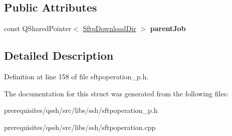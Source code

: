 \subsection*{Public Attributes}
\begin{DoxyCompactItemize}
\item 
\mbox{\label{struct_q_ssh_1_1_internal_1_1_sftp_list_dir_a62a0f58d5fb40ecf64113afe36371c0a}} 
const Q\+Shared\+Pointer$<$ \mbox{\hyperlink{struct_q_ssh_1_1_internal_1_1_sftp_download_dir}{Sftp\+Download\+Dir}} $>$ {\bfseries parent\+Job}
\end{DoxyCompactItemize}


\subsection{Detailed Description}


Definition at line 158 of file sftpoperation\+\_\+p.\+h.



The documentation for this struct was generated from the following files\+:\begin{DoxyCompactItemize}
\item 
prerequisites/qssh/src/libs/ssh/sftpoperation\+\_\+p.\+h\item 
prerequisites/qssh/src/libs/ssh/sftpoperation.\+cpp\end{DoxyCompactItemize}
